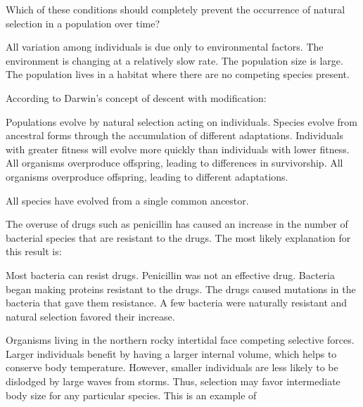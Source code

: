 \question
Which of these conditions should completely prevent the occurrence of natural selection in a population over time?

\begin{choices}
\correctchoice All variation among individuals is due only to environmental factors. %
\choice The environment is changing at a relatively slow rate. %
\choice The population size is large. %
\choice The population lives in a habitat where there are no competing species present. %
\end{choices}

\question
According to Darwin's concept of descent with modification:

\begin{choices}
\choice Populations evolve by natural selection acting on individuals. %
\correctchoice Species evolve from ancestral forms through the accumulation of different adaptations. %
\choice Individuals with greater fitness will evolve more quickly than individuals with lower fitness. %
\choice All organisms overproduce offspring, leading to differences in survivorship. %
\choice All organisms overproduce offspring, leading to different adaptations. %
\end{choices}

\choice All species have evolved from a single common ancestor. %


\question
The overuse of drugs such as penicillin has caused an increase in the number of bacterial species that are resistant to the drugs. The most likely explanation for this result is:

\begin{choices}
\choice Most bacteria can resist drugs. %
\choice Penicillin was not an effective drug. %
\choice Bacteria began making proteins resistant to the drugs. %
\choice The drugs caused mutations in the bacteria that gave them resistance. %
\correctchoice A few bacteria were naturally resistant and natural selection favored their increase. %
\end{choices}

\question
Organisms living in the northern rocky intertidal face competing selective forces. Larger individuals benefit by having a larger internal volume, which helps to conserve body temperature. However, smaller individuals are less likely to be dislodged by large waves from storms. Thus, selection may favor intermediate body size for any particular species. This is an example of

